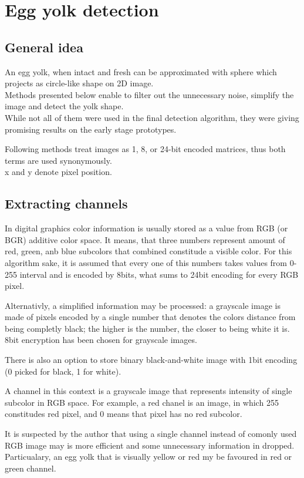 \documentclass[12pt,twoside,a4paper]{article}
\begin{document}
\section{Egg yolk detection}
\subsection{General idea}
An egg yolk, when intact and fresh can be approximated with sphere which projects as circle-like shape on 2D image.\\
Methods presented below enable to filter out the unnecessary noise, simplify the image and detect the yolk shape.\\
While not all of them were used in the final detection algorithm, they were giving promising results on the early stage prototypes.

Following methods treat images as 1, 8, or 24-bit encoded matrices, thus both terms are used synonymously.\\
x and y denote pixel position.
\subsection{Extracting channels}
In digital graphics color information is usually stored as a value from RGB (or BGR) additive color space.
It means, that three numbers represent amount of red, green, anb blue subcolors that combined constitude a visible color.
For this algorithm sake, it is assumed that every one of this numbers takes values from 0-255 interval and is encoded by 8bits, what sums to 24bit encoding for every RGB pixel.

Alternativly, a simplified information may be processed: a grayscale image is made of pixels encoded by a single number that denotes the colors distance from being completly black; the higher is the number, the closer to being white it is.
8bit encryption has been chosen for grayscale images.

There is also an option to store binary black-and-white image with 1bit encoding (0 picked for black, 1 for white).
 
A channel in this context is a grayscale image that represents intensity of single subcolor in RGB space. 
For example, a red chanel is an image, in which 255 constitudes red pixel, and 0 means that pixel has no red subcolor.

It is suspected by the author that using a single channel instead of comonly used RGB image may is more efficient and some unnecessary information in dropped.
Particualary, an egg yolk that is visually yellow or red my be favoured in red or green channel.
\end{document}
